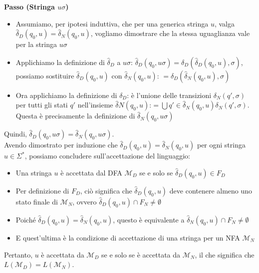\documentclass[12pt, a4paper]{report}
\begin{document}
\begin{demonstration}
                    \textbf{Passo (Stringa $u\sigma$)}
                    \begin{itemize}
                        \item Assumiamo, per ipotesi induttiva, che per una generica stringa $u$, valga $\hat{\delta}_D({q_0}, u) = \hat{\delta}_N(q_0, u)$, vogliamo dimostrare che la stessa uguaglianza vale per la stringa $u\sigma$
                        \item Applichiamo la definizione di $\hat{\delta}_D$ a $u\sigma$: $\hat{\delta}_D({q_0}, u\sigma) = \delta_D(\hat{\delta}_D({q_0}, u), \sigma)$, possiamo sostituire $\hat{\delta}_D({q_0}, u)$ con $\hat{\delta}_N(q_0, u)$: $= \delta_D(\hat{\delta}_N(q_0, u), \sigma)$
                        \item Ora applichiamo la definizione di $\delta_D$: è l'unione delle transizioni $\delta_N(q', \sigma)$ per tutti gli stati $q'$ nell'insieme $\hat{\delta}N(q_0, u)$:$= \bigcup{q' \in \hat{\delta}_N(q_0, u)} \delta_N(q', \sigma)$. Questa è precisamente la definizione di $\hat{\delta}_N(q_0, u\sigma)$
                    \end{itemize}
                    Quindi, $\hat{\delta}_D({q_0}, u\sigma) = \hat{\delta}_N(q_0, u\sigma)$.\\
                    Avendo dimostrato per induzione che $\hat{\delta}_D({q_0}, u) = \hat{\delta}_N(q_0, u)$ per ogni stringa $u \in \Sigma^*$, possiamo concludere sull'accettazione del linguaggio:
                    \begin{itemize}
                        \item Una stringa $u$ è accettata dal DFA $\mathcal{M}_D$ se e solo se $\hat{\delta}_D({q_0}, u) \in F_D$
                        \item Per definizione di $F_D$, ciò significa che $\hat{\delta}_D({q_0}, u)$ deve contenere almeno uno stato finale di $\mathcal{M}_N$, ovvero $\hat{\delta}_D({q_0}, u) \cap F_N \neq \emptyset$
                        \item Poiché $\hat{\delta}_D({q_0}, u) = \hat{\delta}_N(q_0, u)$, questo è equivalente a $\hat{\delta}_N(q_0, u) \cap F_N \neq \emptyset$
                        \item E quest'ultima è la condizione di accettazione di una stringa per un NFA $\mathcal{M}_N$
                    \end{itemize}
                    Pertanto, $u$ è accettata da $\mathcal{M}_D$ se e solo se è accettata da $\mathcal{M}_N$, il che significa che $L(\mathcal{M}_D) = L(\mathcal{M}_N)$.
                \end{demonstration}
\end{document}
